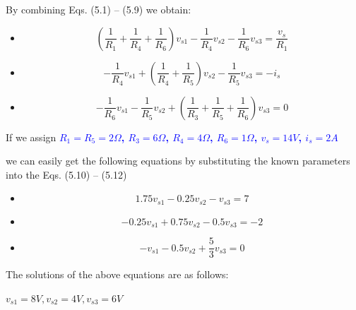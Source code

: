 \documentclass[a4 paper]{article}
\newcommand{\blue}[1]{\textcolor{blue}{#1}}
\numberwithin{equation}{section}
\newcommand{\0}{\mathbf{0}}
\begin{document}
By combining Eqs. (5.1) -- (5.9) we obtain:


\begin{itemize} \itemsep1pt \parskip0pt  
  \item[] \hspace{6.6 cm}\begin{equation}(\frac{1}{R_1}+\frac{1}{R_4}+\frac{1}{R_6})v_{s1} - \frac{1}{R_4}v_{s2} - \frac{1}{R_6}v_{s3} = \frac{v_s}{R_1}\end{equation}
  \item[] \hspace{6.6 cm}\begin{equation}-\frac{1}{R_4}v_{s1} + (\frac{1}{R_4} + \frac{1}{R_5})v_{s2}-\frac{1}{R_5}v_{s3} = -i_s\end{equation}
  \item[] \hspace{6.6 cm}\begin{equation}-\frac{1}{R_6}v_{s1} - \frac{1}{R_5}v_{s2} + (\frac{1}{R_3}+\frac{1}{R_5}+\frac{1}{R_6})v_{s3} = 0\end{equation}
\end{itemize}

If we assign \blue{\bf $R_1 = R_5 = 2\Omega$, $R_3 = 6\Omega$, $R_4 = 4\Omega$, $R_6 = 1\Omega$, $v_s = 14V$, $i_s = 2A$}

we can easily get the following equations by substituting the known parameters into the Eqs. (5.10) -- (5.12)

\begin{itemize} \itemsep1pt \parskip0pt  
  \item[] \hspace{6.6 cm}\begin{equation}1.75v_{s1} - 0.25v_{s2} - v_{s3} = 7\end{equation}
  \item[] \hspace{6.6 cm}\begin{equation}-0.25v_{s1} + 0.75v_{s2}-0.5v_{s3} = -2\end{equation}
  \item[] \hspace{6.6 cm}\begin{equation}-v_{s1} - 0.5v_{s2} + \frac{5}{3}v_{s3} = 0\end{equation}
\end{itemize}

The solutions of the above equations are as follows:

\hspace{6.6 cm}$v_{s1} = 8V, v_{s2} = 4V, v_{s3} = 6V$
\end{document}
